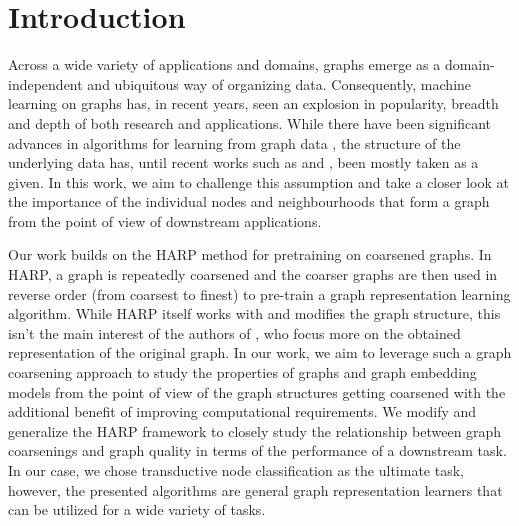 \section{Introduction}
Across a wide variety of applications and domains, graphs emerge as a domain-independent and ubiquitous way of organizing data. Consequently, machine learning on graphs has, in recent years, seen an explosion in popularity, breadth and depth of both research and applications. While there have been significant advances in algorithms for learning from graph data \cite{kipf_semi-supervised_2016, defferrard_convolutional_2016, chamberlain_grand_2021, li_deepergcn_2021}, the structure of the underlying data has, until recent works such as \cite{topping_understanding_2021} and \cite{velickovic_geometric_2021}, been mostly taken as a given. In this work, we aim to challenge this assumption and take a closer look at the importance of the individual nodes and neighbourhoods that form a graph from the point of view of downstream applications.

Our work builds on the HARP \cite{chen_harp_2018} method for pretraining on coarsened graphs. In HARP, a graph is repeatedly coarsened and the coarser graphs are then used in reverse order (from coarsest to finest) to pre-train a graph representation learning algorithm. While HARP itself works with and modifies the graph structure, this isn't the main interest of the authors of \cite{chen_harp_2018}, who focus more on the obtained representation of the original graph. In our work, we aim to leverage such a graph coarsening approach to study the properties of graphs and graph embedding models from the point of view of the graph structures getting coarsened with the additional benefit of improving computational requirements. We modify and generalize the HARP framework to closely study the relationship between graph coarsenings and graph quality in terms of the performance of a downstream task. In our case, we chose transductive node classification as the ultimate task, however, the presented algorithms are general graph representation learners that can be utilized for a wide variety of tasks.


